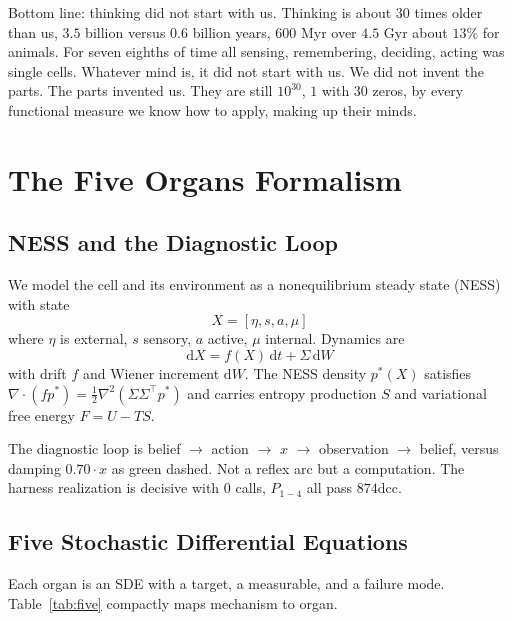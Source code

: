 \documentclass[11pt,a4paper]{article}
\begin{document}
Bottom line: thinking did not start with us. Thinking is about $30$ times older than us, $3.5$ billion versus $0.6$ billion years, $600$ Myr over $4.5$ Gyr about $13\%$ for animals. For seven eighths of time all sensing, remembering, deciding, acting was single cells. Whatever mind is, it did not start with us. We did not invent the parts. The parts invented us. They are still $10^{30}$, $1$ with $30$ zeros, by every functional measure we know how to apply, making up their minds.

\section{The Five Organs Formalism}
\label{sec:five}

\subsection{NESS and the Diagnostic Loop}

We model the cell and its environment as a nonequilibrium steady state (NESS) with state
\begin{equation}
X = [\eta, s, a, \mu]
\end{equation}
where $\eta$ is external, $s$ sensory, $a$ active, $\mu$ internal. Dynamics are
\begin{equation}
\mathrm{d}X = f(X)\,\mathrm{d}t + \Sigma\,\mathrm{d}W
\end{equation}
with drift $f$ and Wiener increment $\mathrm{d}W$. The NESS density $p^*(X)$ satisfies $\nabla \cdot (f p^*) = \frac{1}{2} \nabla^2 (\Sigma \Sigma^{\top} p^*)$ and carries entropy production $S$ and variational free energy $F = U - TS$.

The diagnostic loop is belief $\to$ action $\to$ $x$ $\to$ observation $\to$ belief, versus damping $0.70 \cdot x$ as green dashed. Not a reflex arc but a computation. The harness realization is decisive with $0$ calls, $P_{1-4}$ all pass $874\text{dcc}$.

\subsection{Five Stochastic Differential Equations}

Each organ is an SDE with a target, a measurable, and a failure mode. Table~\ref{tab:five} compactly maps mechanism to organ.
\end{document}
